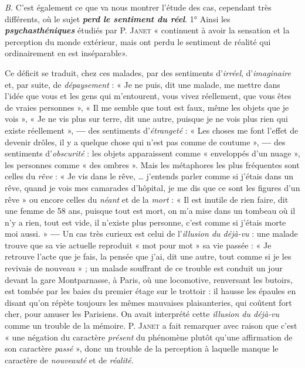 {\it B.} C’est également ce que va nous montrer l’étude des cas, cependant
très différents, où le sujet \textbf{\textit {perd le sentiment du réel}}. 1° Ainsi
les \textbf{\textit {psychasthéniques}} étudiés par P. \textsc{Janet} « continuent à avoir la
sensation et la perception du monde extérieur, mais ont perdu le
sentiment de réalité qui ordinairement en est inséparable».

Ce déficit se traduit, chez ces malades, par des sentiments d’\textsf{\textit {irréel}},
d’\textsf{\textit {imaginaire}}
et, par suite, de \textsf{\textit {dépaysement}} : « Je ne puis, dit une malade, me mettre
dans l’idée que vous et les gens qui m'entourent, vous vivez réellement,
que vous êtes de vraies personnes », « Il me semble que tout est faux, même
les objets que je vois », « Je ne vis plus sur terre, dit une autre, puisque je
ne vois plus rien qui existe réellement », {\bf —} des sentiments d’\textsf{\textit {étrangeté}} :
« Les choses me font l’effet de devenir drôles, il y a quelque chose qui n’est
pas comme de coutume », {\bf —} des sentiments d’\textsf{\textit {obscurité}} : les objets apparaissent
comme « enveloppés d’un nuage », les personnes comme « des
ombres ». Mais les métaphores les plus fréquentes sont celles du \textsf{\textit {rêve}} : « Je vis
dans le rêve, … j'entends parler comme si j'étais dans un rêve, quand je
vois mes camarades d'hôpital, je me dis que ce sont les figures d’un rêve »
ou encore celles du \textsf{\textit {néant}} et de la \textsf{\textit {mort}} :
« Il est inutile de rien faire, dit
une femme de 58 ans, puisque tout est mort, on m'a mise dans un tombeau
où il n'y a rien, tout est vide, il n'existe plus personne, c'est comme si
j'étais morte moi aussi. » {\bf —} Un cas très curieux est celui de l'\textsf{\textit {illusion du
déjà-vu}} : une malade trouve que sa vie actuelle reproduit « mot pour mot »
sa vie passée : « Je retrouve l'acte que je fais, la pensée que j'ai, dit une
autre, tout comme si je les revivais de nouveau » ; un malade souffrant de ce
trouble est conduit un jour devant la gare Montparnasse, à Paris, où une
locomotive, renversant les butoirs, est tombée par les baies du premier étage
sur le trottoir : il hausse les épaules en disant qu’on répète toujours les
mêmes mauvaises plaisanteries, qui coûtent fort cher, pour amuser les
Parisiens. On avait interprété cette {\it illusion du déjà-vu} comme un trouble de
la mémoire. P. \textsc{Janet} a fait remarquer avec raison que c'est « une négation
du caractère {\it présent} du phénomène plutôt qu’une affirmation de son caractère
{\it passé} », donc un trouble de la perception à laquelle manque le caractère
de {\it nouveauté} et de {\it réalité}.

